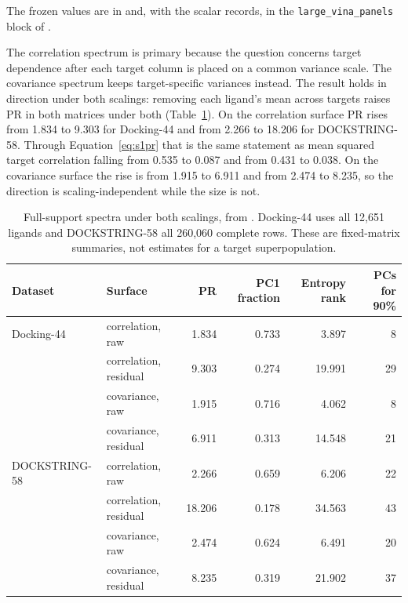 

The frozen values are in  and, with the
scalar records, in the \texttt{large\_vina\_panels} block of
.

The correlation spectrum is primary because the question concerns target dependence after each
target column is placed on a common variance scale. The covariance spectrum keeps
target-specific variances instead. The result holds in direction under both scalings: removing
each ligand's mean across targets raises PR in both matrices under both
(Table~\ref{tab:s2spectra}). On the correlation surface PR rises from 1.834 to 9.303 for
Docking-44 and from 2.266 to 18.206 for DOCKSTRING-58. Through Equation~\ref{eq:s1pr} that is
the same statement as mean squared target correlation falling from 0.535 to 0.087 and from
0.431 to 0.038. On the covariance surface the rise is from 1.915 to 6.911 and from 2.474 to
8.235, so the direction is scaling-independent while the size is not.

\begin{table}[htbp]
\centering
\caption{Full-support spectra under both scalings, from
\protect{}. Docking-44 uses all 12{,}651 ligands and
DOCKSTRING-58 all 260{,}060 complete rows. These are fixed-matrix summaries, not estimates for
a target superpopulation.}
\label{tab:s2spectra}
\small
\begin{tabular}{llrrrr}
\toprule
Dataset & Surface & PR & PC1 fraction & Entropy rank & PCs for 90\% \\
\midrule
Docking-44 & correlation, raw & 1.834 & 0.733 & 3.897 & 8 \\
 & correlation, residual & 9.303 & 0.274 & 19.991 & 29 \\
 & covariance, raw & 1.915 & 0.716 & 4.062 & 8 \\
 & covariance, residual & 6.911 & 0.313 & 14.548 & 21 \\
\addlinespace
DOCKSTRING-58 & correlation, raw & 2.266 & 0.659 & 6.206 & 22 \\
 & correlation, residual & 18.206 & 0.178 & 34.563 & 43 \\
 & covariance, raw & 2.474 & 0.624 & 6.491 & 20 \\
 & covariance, residual & 8.235 & 0.319 & 21.902 & 37 \\
\bottomrule
\end{tabular}
\end{table}

